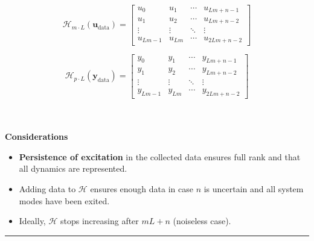 \begin{minipage}{0.43\textwidth}
    \[
    \mathcal{H}_{m \cdot L}(\textbf{u}_{\text{data}}) = 
    \begin{bmatrix}
    u_0 & u_1 & \cdots & u_{Lm+n-1} \\
    u_1 & u_2 & \cdots & u_{Lm+n-2} \\
    \vdots & \vdots & \ddots & \vdots \\
    u_{Lm-1} & u_{Lm} & \cdots & u_{2Lm+n-2}
    \end{bmatrix}
    \]
\end{minipage}
\begin{minipage}{0.43\textwidth}
    \[
    \mathcal{H}_{p \cdot L}(\textbf{y}_{\text{data}}) = 
    \begin{bmatrix}
    y_0 & y_1 & \cdots & y_{Lm+n-1} \\
    y_1 & y_2 & \cdots & y_{Lm+n-2} \\
    \vdots & \vdots & \ddots & \vdots \\
    y_{Lm-1} & y_{Lm}  & \cdots & y_{2Lm+n-2}
    \end{bmatrix}
    \]
\end{minipage}\\ \\
\textbf{Considerations}
\begin{itemize}
    \item \textbf{Persistence of excitation} in the collected data ensures full rank and that all dynamics are represented.
    \item Adding data to $\mathcal{H}$ ensures enough data in case $n$ is uncertain and all system modes have been exited.
    \item Ideally, $\mathcal{H}$ stops increasing after $mL+n$ (noiseless case).
\end{itemize}

\hrule

